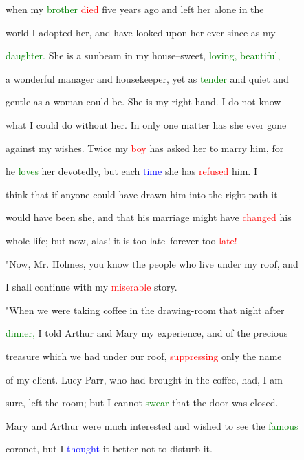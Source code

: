  when my \textcolor{green}{brother} \textcolor{red}{died} five years ago and left her alone in the

 world I adopted her, and have looked upon her ever since as my

 \textcolor{green}{daughter.} She is a sunbeam in my house--sweet, \textcolor{green}{loving,} \textcolor{green}{beautiful,}

 a \textcolor{BurntOrange}{wonderful} manager and housekeeper, yet as \textcolor{green}{tender} and \textcolor{BurntOrange}{quiet} and

 gentle as a woman could be. She is my right hand. I do not know

 what I could do without her. In only one matter has she ever gone

 against my wishes. Twice my \textcolor{red}{boy} has asked her to \textcolor{BurntOrange}{marry} him, for

 he \textcolor{green}{loves} her devotedly, but each \textcolor{blue}{time} she has \textcolor{red}{refused} him. I

 think that if anyone could have drawn him into the right path it

 would have been she, and that his \textcolor{BurntOrange}{marriage} might have \textcolor{red}{changed} his

 whole life; but now, alas! it is too late--forever too \textcolor{red}{late!}



 "Now, Mr. Holmes, you know the people who live under my roof, and

 I shall \textcolor{BurntOrange}{continue} with my \textcolor{red}{miserable} story.



 "When we were taking coffee in the drawing-room that night after

 \textcolor{green}{dinner,} I told Arthur and Mary my experience, and of the \textcolor{BurntOrange}{precious}

 \textcolor{BurntOrange}{treasure} which we had under our roof, \textcolor{red}{suppressing} only the name

 of my client. Lucy Parr, who had brought in the coffee, had, I am

 sure, left the room; but I cannot \textcolor{green}{swear} that the door was closed.

 Mary and Arthur were much \textcolor{BurntOrange}{interested} and wished to see the \textcolor{green}{famous}

 coronet, but I \textcolor{blue}{thought} it better not to disturb it.



